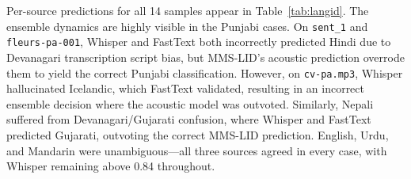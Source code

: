 \documentclass[conference]{IEEEtran}
\begin{document}
Per-source predictions for all 14 samples appear in Table~\ref{tab:langid}. The ensemble dynamics are highly visible in the Punjabi cases. On \texttt{sent\_1} and \texttt{fleurs-pa-001}, Whisper and FastText both incorrectly predicted Hindi due to Devanagari transcription script bias, but MMS-LID's acoustic prediction overrode them to yield the correct Punjabi classification. However, on \texttt{cv-pa.mp3}, Whisper hallucinated Icelandic, which FastText validated, resulting in an incorrect ensemble decision where the acoustic model was outvoted. Similarly, Nepali suffered from Devanagari/Gujarati confusion, where Whisper and FastText predicted Gujarati, outvoting the correct MMS-LID prediction. English, Urdu, and Mandarin were unambiguous---all three sources agreed in every case, with Whisper remaining above 0.84 throughout.
\end{document}
